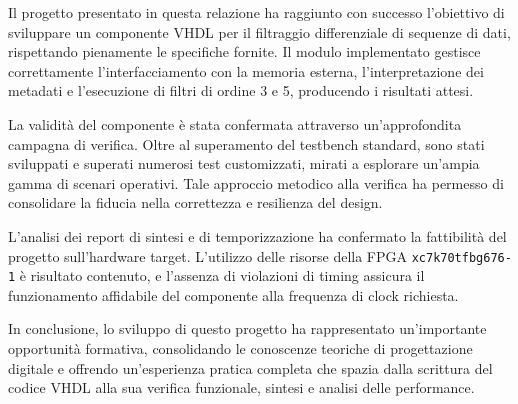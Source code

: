 \documentclass{article}
\begin{document}
Il progetto presentato in questa relazione ha raggiunto con successo l'obiettivo di sviluppare un componente VHDL per il filtraggio differenziale di sequenze di dati, rispettando pienamente le specifiche fornite. Il modulo implementato gestisce correttamente l'interfacciamento con la memoria esterna, l'interpretazione dei metadati e l'esecuzione di filtri di ordine 3 e 5, producendo i risultati attesi.

La validità del componente è stata confermata attraverso un'approfondita campagna di verifica. Oltre al superamento del testbench standard, sono stati sviluppati e superati numerosi test customizzati, mirati a esplorare un'ampia gamma di scenari operativi. Tale approccio metodico alla verifica ha permesso di consolidare la fiducia nella correttezza e resilienza del design.

L'analisi dei report di sintesi e di temporizzazione ha confermato la fattibilità del progetto sull'hardware target. L'utilizzo delle risorse della FPGA \texttt{xc7k70tfbg676-1} è risultato contenuto, e l'assenza di violazioni di timing assicura il funzionamento affidabile del componente alla frequenza di clock richiesta.

In conclusione, lo sviluppo di questo progetto ha rappresentato un'importante opportunità formativa, consolidando le conoscenze teoriche di progettazione digitale e offrendo un'esperienza pratica completa che spazia dalla scrittura del codice VHDL alla sua verifica funzionale, sintesi e analisi delle performance.
\end{document}
